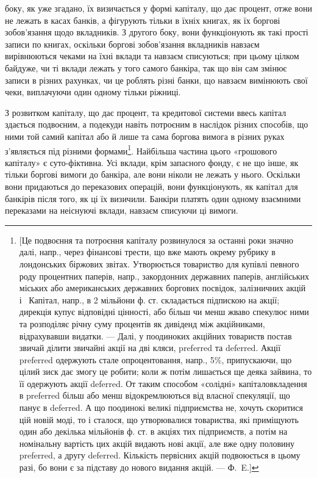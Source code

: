 \parcont{}  %
боку, як уже згадано, їх визичається у формі капіталу, що дає процент, отже
вони не лежать в касах банків, а фігурують тільки в їхніх книгах, як їх боргові
зобов’язання щодо вкладників. З другого боку, вони функціонують як такі прості
записи по книгах, оскільки боргові зобов’язання вкладників навзаєм вирівнюються
чеками на їхні вклади та навзаєм списуються; при цьому цілком байдуже,
чи ті вклади лежать у того самого банкіра, так що він сам змінює записи
в різних рахунках, чи це роблять різні банки, що навзаєм вимінюють свої
чеки, виплачуючи один одному тільки ріжниці.

З розвитком капіталу, що дає процент, та кредитової системи ввесь капітал
здається подвоєним, а подекуди навіть потроєним в наслідок різних способів,
що ними той самий капітал або й лише та сама боргова вимога в різних
руках з’являється під різними формами\footnote{
[Це подвоєння та потроєння капіталу розвинулося за останні роки значно далі, напр., через
фінансові трести, що вже мають окрему рубрику в лондонських біржових звітах. Утворюється товариство
для купівлі певного роду процентних паперів, напр., закордонних державних паперів, англійських
міських або американських державних боргових посвідок, залізничних акцій і~ Капітал,
напр., в 2 мільйони ф. ст. складається підпискою на акції; дирекція купує відповідні цінності, або
більш чи менш жваво спекулює ними та розподіляє річну суму процентів як дивіденд між акційниками,
відрахувавши видатки. — Далі, у поодиноких акційних товариств постав звичай ділити звичайні акції
на дві кляси, preferred та deferred. Акції preferred одержують стале опроцентовання, напр., 5\%,
припускаючи, що цілий зиск дає змогу це робити; коли ж потім лишається ще деяка зайвина, то її
одержують акції deferred. От таким способом «солідні» капіталовкладення в preferred більш або менш
відокремлюються від власної спекуляції, що панує в deferred. А що поодинокі великі підприємства
не, хочуть скоритися цій новій моді, то і сталося, що утворювалися товариства, які приміщують один
або декілька мільйонів ф. ст. в акціях тих підприємств, а потім на номінальну вартість цих акцій
видають
нові акції, але вже одну половину preferred, а другу deferred. Кількість первісних акцій подвоюється
в цьому разі, бо вони є за підставу до нового видання акцій. — Ф.~E.]
}. Найбільша частина цього «грошового
капіталу» є суто-фіктивна. Усі вклади, крім запасного фонду, є не що інше,
як тільки боргові вимоги до банкіра, але вони ніколи не лежать у нього. Оскільки
вони придаються до переказових операцій, вони функціонують, як капітал для
банкірів після того, як ці їх визичили. Банкіри платять один одному взаємними
переказами на неіснуючі вклади, навзаєм списуючи ці вимоги.

